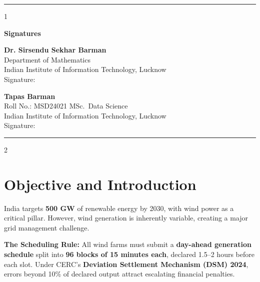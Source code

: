\documentclass[11pt,a4paper]{article}
\begin{document}
\vfill
\hrule
\vspace{0.3cm}
\begin{center}{\small 1}\end{center}

\newpage
\thispagestyle{empty}

\begin{center}
    {\large \textbf{Signatures}}
\end{center}
\vspace{0.8cm}

\noindent \textbf{Dr. Sirsendu Sekhar Barman}\\
Department of Mathematics\\
Indian Institute of Information Technology, Lucknow\\[1.2cm]
\noindent Signature:\enspace \underline{\hspace{6cm}}

\vspace{1.8cm}

\noindent \textbf{Tapas Barman}\\
Roll No.: MSD24021 \quad MSc.\ Data Science\\
Indian Institute of Information Technology, Lucknow\\[1.2cm]
\noindent Signature:\enspace \underline{\hspace{6cm}}

\vfill
\hrule
\vspace{0.3cm}
\begin{center}{\small 2}\end{center}

\newpage
\setcounter{page}{3}

\section{Objective and Introduction}

India targets \textbf{500 GW} of renewable energy by 2030, with wind power as a critical pillar. However, wind generation is inherently variable, creating a major grid management challenge.

\textbf{The Scheduling Rule:} All wind farms must submit a \textbf{day-ahead generation schedule} split into \textbf{96 blocks of 15 minutes each}, declared 1.5--2 hours before each slot. Under CERC's \textbf{Deviation Settlement Mechanism (DSM) 2024}, errors beyond 10\% of declared output attract escalating financial penalties.
\end{document}
